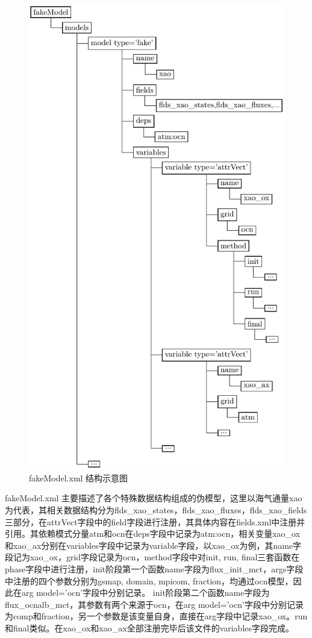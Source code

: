\begin{figure}[h]
\begin{minipage}[t]{0.5\linewidth}
\includegraphics[height=.5\textheight]{../figures/fakeModel.pdf}
\caption{fakeModel.xml 结构示意图}
\end{minipage}
\end{figure}

fakeModel.xml 主要描述了各个特殊数据结构组成的伪模型，这里以海气通量xao为代表，其相关数据结构分为flds\_xao\_states，flds\_xao\_fluxes，flds\_xao\_fields三部分，在attrVect字段中的field字段进行注册，其具体内容在fields.xml中注册并引用。其依赖模式分量atm和ocn在deps字段中记录为atm:ocn，相关变量xao\_ox和xao\_ax分别在variables字段中记录为variable字段，以xao\_ox为例，其name字段记为xao\_ox，grid字段记录为ocn，method字段中对init, run, final三套函数在phase字段中进行注册，init阶段第一个函数name字段为flux\_init\_mct，args字段中注册的四个参数分别为gsmap, domain, mpicom, fraction，均通过ocn模型，因此在arg model='ocn'字段中分别记录。 init阶段第二个函数name字段为flux\_ocnalb\_mct，其参数有两个来源于ocn，在arg model='ocn'字段中分别记录为comp和fraction，另一个参数是该变量自身，直接在arg字段中记录xao\_ox。run和final类似。在xao\_ox和xao\_ax全部注册完毕后该文件的variables字段完成。

